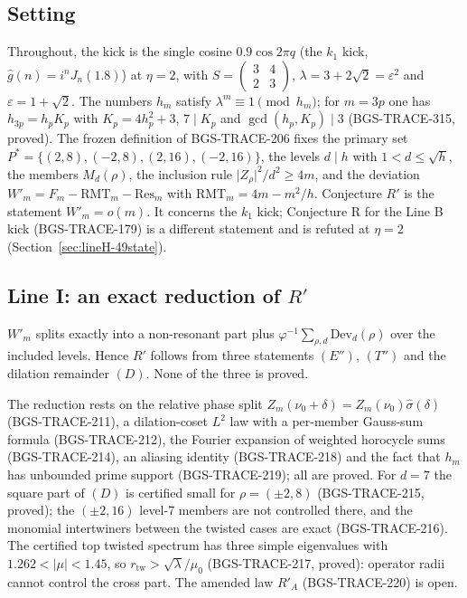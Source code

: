 \subsection{Setting}
\label{sec:lines-I-N-setting}
Throughout, the kick is the single cosine \(0.9\cos2\pi q\) (the \(k_1\) kick, \(\hat g(n)=i^nJ_n(1.8)\)) at \(\eta=2\), with \(S=\begin{pmatrix}3&4\\2&3\end{pmatrix}\), \(\lambda=3+2\sqrt2=\varepsilon^2\) and \(\varepsilon=1+\sqrt2\). The numbers \(h_m\) satisfy \(\lambda^m\equiv1\pmod{h_m}\); for \(m=3p\) one has \(h_{3p}=h_pK_p\) with \(K_p=4h_p^2+3\), \(7\mid K_p\) and \(\gcd(h_p,K_p)\mid3\) (BGS-TRACE-315, proved). The frozen definition of BGS-TRACE-206 fixes the primary set \(P^*=\{(2,8),(-2,8),(2,16),(-2,16)\}\), the levels \(d\mid h\) with \(1<d\le\sqrt h\), the members \(M_d(\rho)\), the inclusion rule \(\lvert Z_\rho\rvert^2/d^2\ge4m\), and the deviation \(W'_m=F_m-\mathrm{RMT}_m-\mathrm{Res}_m\) with \(\mathrm{RMT}_m=4m-m^2/h\). Conjecture \(R'\) is the statement \(W'_m=o(m)\). It concerns the \(k_1\) kick; Conjecture R for the Line B kick (BGS-TRACE-179) is a different statement and is refuted at \(\eta=2\) (Section~\ref{sec:lineH-49state}).

\subsection{Line I: an exact reduction of \texorpdfstring{$R'$}{R'}}
\label{sec:lines-I-N-lineI}
\begin{theorem}
\(W'_m\) splits exactly into a non-resonant part plus \(\varphi^{-1}\sum_{\rho,d}\mathrm{Dev}_d(\rho)\) over the included levels. Hence \(R'\) follows from three statements \((E'')\), \((T'')\) and the dilation remainder \((D)\). None of the three is proved.
\end{theorem}
The reduction rests on the relative phase split \(Z_m(\nu_0+\delta)=Z_m(\nu_0)\hat\sigma(\delta)\) (BGS-TRACE-211), a dilation-coset \(L^2\) law with a per-member Gauss-sum formula (BGS-TRACE-212), the Fourier expansion of weighted horocycle sums (BGS-TRACE-214), an aliasing identity (BGS-TRACE-218) and the fact that \(h_m\) has unbounded prime support (BGS-TRACE-219); all are proved. For \(d=7\) the square part of \((D)\) is certified small for \(\rho=(\pm2,8)\) (BGS-TRACE-215, proved); the \((\pm2,16)\) level-7 members are not controlled there, and the monomial intertwiners between the twisted cases are exact (BGS-TRACE-216). The certified top twisted spectrum has three simple eigenvalues with \(1.262<\lvert\mu\rvert<1.45\), so \(r_{\mathrm{tw}}>\sqrt\lambda/\mu_0\) (BGS-TRACE-217, proved): operator radii cannot control the cross part. The amended law \(R'_A\) (BGS-TRACE-220) is open.

